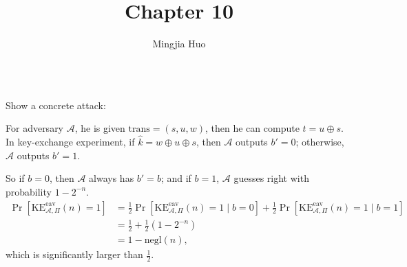 \documentclass[a4paper]{article}
\newcommand{\negl}{\text{negl}}
\newcommand{\eav}{\text{eav}}
\newcommand{\KE}{\text{KE}}
\newcommand{\trans}{\text{trans}}
\newcommand{\A}{\mathcal{A}}
\newenvironment{problem}[2][Problem]{\begin{trivlist}
\item[\hskip \labelsep {\bfseries #1}\hskip \labelsep {\bfseries #2.}]}{\end{trivlist}}
\begin{document}
 
 
\title{Chapter 10}
\author{Mingjia Huo}
\date{}
\maketitle

\begin{problem}{10.4} 
$ $\par
Show a concrete attack:\par
For adversary $\A$, he is given $\trans=(s,u,w)$, then he can compute $t=u\oplus s$. In key-exchange experiment, if $\hat k=w\oplus u\oplus s$, then $\A$ outputs $b'=0$; otherwise, $\A$ outputs $b'=1$.\par
So if $b=0$, then $\A$ always has $b'=b$; and if $b=1$, $\A$ guesses right with probability $1-2^{-n}$.
\begin{align*}
    \Pr[\KE_{\A,\Pi}^{\eav}(n)=1]&=\frac12\Pr[\KE_{\A,\Pi}^{\eav}(n)=1\mid b=0]+\frac12\Pr[\KE_{\A,\Pi}^{\eav}(n)=1\mid b=1]\\
    &=\frac12+\frac12(1-2^{-n})\\
    &=1-\negl(n),
\end{align*}which is significantly larger than $\frac12$.
\end{problem}
\end{document}
